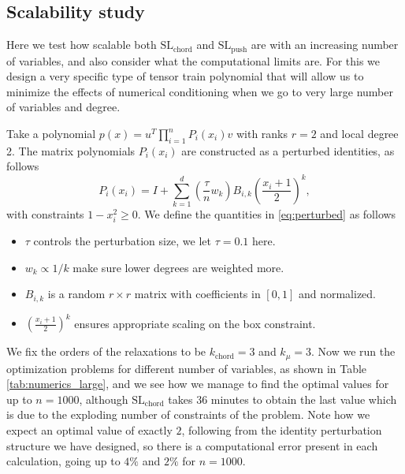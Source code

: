 \documentclass[11pt,a4paper]{article}
\theoremstyle{definition}
\begin{document}
\subsection{Scalability study}

Here we test how scalable both $\mathrm{SL}_{\mathrm{chord}}$ and $\mathrm{SL}_{\mathrm{push}}$ are with an increasing number of variables, and also consider what the computational limits are. For this we design a very specific type of tensor train polynomial that will allow us to minimize the effects of numerical conditioning when we go to very large number of variables and degree. 

Take a polynomial $p(x)=u^T\prod_{i=1}^n P_i(x_i)v$ with ranks $r=2$ and local degree 2. The matrix polynomials $P_i(x_i)$ are constructed as a perturbed identities, as follows
\begin{equation}
    P_i(x_i)=I+\sum_{k=1}^d (\frac{\tau}{n}w_k)B_{i,k}(\frac{x_i+1}{2})^k,
    \label{eq:perturbed}
\end{equation}
with constraints $1-x_i^2\geq 0$. We define the quantities in \ref{eq:perturbed} as follows
\begin{itemize}
    \item $\tau$ controls the perturbation size, we let $\tau=0.1$ here.
    \item $w_k \propto 1/k$ make sure lower degrees are weighted more.
    \item $B_{i,k}$ is a random $r\times r$ matrix with coefficients in $[0,1]$ and normalized.
    \item $(\frac{x_i+1}{2})^k$ ensures appropriate scaling on the box constraint.
\end{itemize}

We fix the orders of the relaxations to be $k_{\text{chord}}=3$ and $k_{\mu}=3$.  Now we run the optimization problems for different number of variables, as shown in Table \ref{tab:numerics_large}, and we see how we manage to find the optimal values for up to $n=1000$, although $\mathrm{SL}_{\mathrm{chord}}$ takes 36 minutes to obtain the last value which is due to the exploding number of constraints of the problem. Note how we expect an optimal value of exactly $2$, following from the identity perturbation structure we have designed, so there is a computational error present in each calculation, going up to $4\%$ and $2\%$ for $n=1000$.
\end{document}

